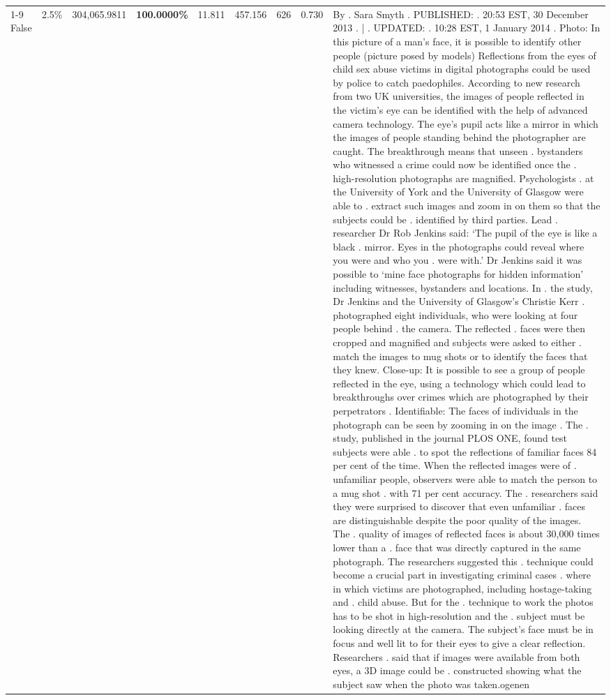 \begin{table}[H]
\begin{tabular}{lllrlllll}
\cline{1-9}
False & 2.5\% & 304,065.9811 & \bfseries \color{red} 100.0000\% & 11.811 & 457.156 & 626 & 0.730 & By . Sara Smyth . PUBLISHED: . 20:53 EST, 30 December 2013 . | . UPDATED: . 10:28 EST, 1 January 2014 . Photo: In this picture of a man's face, it is possible to identify other people (picture posed by models) Reflections from the eyes of child sex abuse victims in digital photographs could be used by police to catch paedophiles. According to new research from two UK universities, the images of people reflected in the victim's eye can be identified with the help of advanced camera technology. The eye's pupil acts like a mirror in which the images of people standing behind the photographer are caught. The breakthrough means that unseen . bystanders who witnessed a crime could now be identified once the . high-resolution photographs are magnified. Psychologists . at the University of York and the University of Glasgow were able to . extract such images and zoom in on them so that the subjects could be . identified by third parties. Lead . researcher Dr Rob Jenkins said: ‘The pupil of the eye is like a black . mirror. Eyes in the photographs could reveal where you were and who you . were with.' Dr Jenkins said it was possible to ‘mine face photographs for hidden information' including witnesses, bystanders and locations. In . the study, Dr Jenkins and the University of Glasgow's Christie Kerr . photographed eight individuals, who were looking at four people behind . the camera. The reflected . faces were then cropped and magnified and subjects were asked to either . match the images to mug shots or to identify the faces that they knew. Close-up: It is possible to see a group of people reflected in the eye, using a technology which could lead to breakthroughs over crimes which are photographed by their perpetrators . Identifiable: The faces of individuals in the photograph can be seen by zooming in on the image . The . study, published in the journal PLOS ONE, found test subjects were able . to spot the reflections of familiar faces 84 per cent of the time. When the reflected images were of . unfamiliar people, observers were able to match the person to a mug shot . with 71 per cent accuracy. The . researchers said they were surprised to discover that even unfamiliar . faces are distinguishable despite the poor quality of the images. The . quality of images of reflected faces is about 30,000 times lower than a . face that was directly captured in the same photograph. The researchers suggested this . technique could become a crucial part in investigating criminal cases . where in which victims are photographed, including hostage-taking and . child abuse. But for the . technique to work the photos has to be shot in high-resolution and the . subject must be looking directly at the camera. The subject's face must be in focus and well lit to for their eyes to give a clear reflection. Researchers . said that if images were available from both eyes, a 3D image could be . constructed showing what the subject saw when the photo was taken.ogenen \\

\end{tabular}
\end{table}
